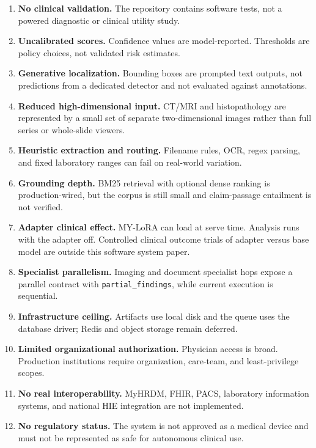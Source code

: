 \documentclass[conference]{IEEEtran}
\begin{document}
\begin{enumerate}
    \item \textbf{No clinical validation.} The repository contains software tests, not a powered diagnostic or clinical utility study.
    \item \textbf{Uncalibrated scores.} Confidence values are model-reported. Thresholds are policy choices, not validated risk estimates.
    \item \textbf{Generative localization.} Bounding boxes are prompted text outputs, not predictions from a dedicated detector and not evaluated against annotations.
    \item \textbf{Reduced high-dimensional input.} CT/MRI and histopathology are represented by a small set of separate two-dimensional images rather than full series or whole-slide viewers.
    \item \textbf{Heuristic extraction and routing.} Filename rules, OCR, regex parsing, and fixed laboratory ranges can fail on real-world variation.
    \item \textbf{Grounding depth.} BM25 retrieval with optional dense ranking is production-wired, but the corpus is still small and claim-passage entailment is not verified.
    \item \textbf{Adapter clinical effect.} MY-LoRA can load at serve time. Analysis runs with the adapter off. Controlled clinical outcome trials of adapter versus base model are outside this software system paper.
    \item \textbf{Specialist parallelism.} Imaging and document specialist hops expose a parallel contract with \texttt{partial\_findings}, while current execution is sequential.
    \item \textbf{Infrastructure ceiling.} Artifacts use local disk and the queue uses the database driver; Redis and object storage remain deferred.
    \item \textbf{Limited organizational authorization.} Physician access is broad. Production institutions require organization, care-team, and least-privilege scopes.
    \item \textbf{No real interoperability.} MyHRDM, FHIR, PACS, laboratory information systems, and national HIE integration are not implemented.
    \item \textbf{No regulatory status.} The system is not approved as a medical device and must not be represented as safe for autonomous clinical use.
\end{enumerate}
\end{document}
